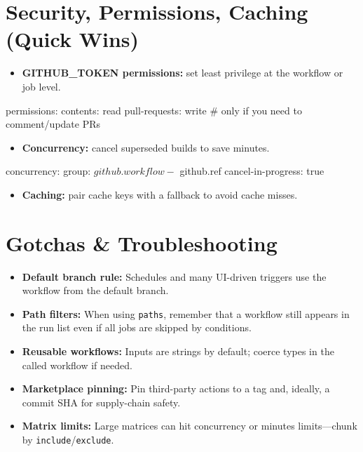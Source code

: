 \documentclass[11pt]{article}
\begin{document}
\section{Security, Permissions, Caching (Quick Wins)}
\begin{itemize}
  \item \textbf{GITHUB\_TOKEN permissions:} set least privilege at the workflow or job level.
\end{itemize}

\begin{yamlcode}
permissions:
  contents: read
  pull-requests: write  # only if you need to comment/update PRs
\end{yamlcode}

\begin{itemize}
  \item \textbf{Concurrency:} cancel superseded builds to save minutes.
\end{itemize}

\begin{yamlcode}
concurrency:
  group: ${{ github.workflow }}-${{ github.ref }}
  cancel-in-progress: true
\end{yamlcode}

\begin{itemize}
  \item \textbf{Caching:} pair cache keys with a fallback to avoid cache misses.
\end{itemize}


\section{Gotchas \& Troubleshooting}
\begin{itemize}
  \item \textbf{Default branch rule:} Schedules and many UI-driven triggers use the workflow from the default branch.
  \item \textbf{Path filters:} When using \texttt{paths}, remember that a workflow still appears in the run list even if all jobs are skipped by conditions.
  \item \textbf{Reusable workflows:} Inputs are strings by default; coerce types in the called workflow if needed.
  \item \textbf{Marketplace pinning:} Pin third-party actions to a tag and, ideally, a commit SHA for supply-chain safety.
  \item \textbf{Matrix limits:} Large matrices can hit concurrency or minutes limits—chunk by \texttt{include}/\texttt{exclude}.
\end{itemize}
\end{document}
